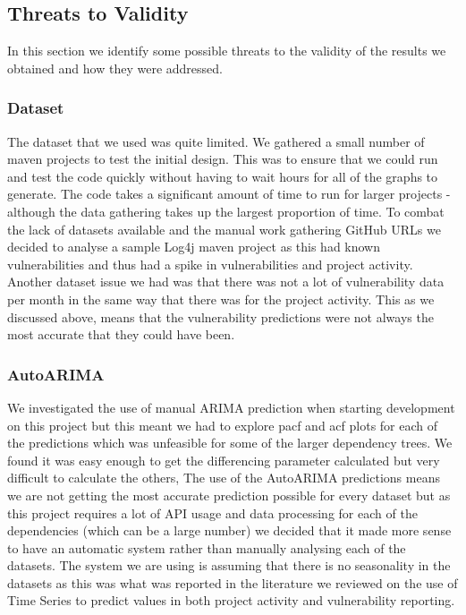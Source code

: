 \documentclass[conference]{IEEEtran}
\begin{document}
\subsection{Threats to Validity}
In this section we identify some possible threats to the validity of the results we obtained and how they were addressed. 

\subsubsection{Dataset}
The dataset that we used was quite limited. We gathered a small number of maven projects to test the initial design. This was to ensure that we could run and test the code quickly without having to wait hours for all of the graphs to generate. The code takes a significant amount of time to run for larger projects - although the data gathering takes up the largest proportion of time. To combat the lack of datasets available and the manual work gathering GitHub URLs we decided to analyse a sample Log4j maven project as this had known vulnerabilities and thus had a spike in vulnerabilities and project activity. Another dataset issue we had was that there was not a lot of vulnerability data per month in the same way that there was for the project activity. This as we discussed above, means that the vulnerability predictions were not always the most accurate that they could have been. 

\subsubsection{AutoARIMA}
We investigated the use of manual ARIMA prediction when starting development on this project but this meant we had to explore pacf and acf plots for each of the predictions which was unfeasible for some of the larger dependency trees. We found it was easy enough to get the differencing parameter calculated but very difficult to calculate the others, The use of the AutoARIMA predictions means we are not getting the most accurate prediction possible for every dataset but as this project requires a lot of API usage and data processing for each of the dependencies (which can be a large number) we decided that it made more sense to have an automatic system rather than manually analysing each of the datasets. The system we are using is assuming that there is no seasonality in the datasets as this was what was reported in the literature we reviewed on the use of Time Series to predict values in both project activity and vulnerability reporting. 
\end{document}
